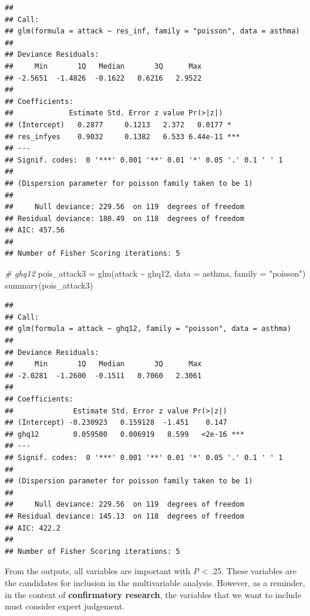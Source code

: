 \documentclass[
  10pt,
]{krantz}
\newenvironment{Shaded}{\begin{snugshade}}{\end{snugshade}}
\newcommand{\AttributeTok}[1]{\textcolor[rgb]{0.77,0.63,0.00}{#1}}
\newcommand{\CommentTok}[1]{\textcolor[rgb]{0.56,0.35,0.01}{\textit{#1}}}
\newcommand{\FunctionTok}[1]{\textcolor[rgb]{0.00,0.00,0.00}{#1}}
\newcommand{\NormalTok}[1]{#1}
\newcommand{\OtherTok}[1]{\textcolor[rgb]{0.56,0.35,0.01}{#1}}
\newcommand{\SpecialCharTok}[1]{\textcolor[rgb]{0.00,0.00,0.00}{#1}}
\newcommand{\StringTok}[1]{\textcolor[rgb]{0.31,0.60,0.02}{#1}}
\begin{document}
\begin{verbatim}
## 
## Call:
## glm(formula = attack ~ res_inf, family = "poisson", data = asthma)
## 
## Deviance Residuals: 
##     Min       1Q   Median       3Q      Max  
## -2.5651  -1.4826  -0.1622   0.6216   2.9522  
## 
## Coefficients:
##             Estimate Std. Error z value Pr(>|z|)    
## (Intercept)   0.2877     0.1213   2.372   0.0177 *  
## res_infyes    0.9032     0.1382   6.533 6.44e-11 ***
## ---
## Signif. codes:  0 '***' 0.001 '**' 0.01 '*' 0.05 '.' 0.1 ' ' 1
## 
## (Dispersion parameter for poisson family taken to be 1)
## 
##     Null deviance: 229.56  on 119  degrees of freedom
## Residual deviance: 180.49  on 118  degrees of freedom
## AIC: 457.56
## 
## Number of Fisher Scoring iterations: 5
\end{verbatim}

\begin{Shaded}
\begin{Highlighting}[]
\CommentTok{\# ghq12}
\NormalTok{pois\_attack3 }\OtherTok{=} \FunctionTok{glm}\NormalTok{(attack }\SpecialCharTok{\textasciitilde{}}\NormalTok{ ghq12, }\AttributeTok{data =}\NormalTok{ asthma, }\AttributeTok{family =} \StringTok{"poisson"}\NormalTok{)}
\FunctionTok{summary}\NormalTok{(pois\_attack3)}
\end{Highlighting}
\end{Shaded}

\begin{verbatim}
## 
## Call:
## glm(formula = attack ~ ghq12, family = "poisson", data = asthma)
## 
## Deviance Residuals: 
##     Min       1Q   Median       3Q      Max  
## -2.0281  -1.2600  -0.1511   0.7060   2.3061  
## 
## Coefficients:
##              Estimate Std. Error z value Pr(>|z|)    
## (Intercept) -0.230923   0.159128  -1.451    0.147    
## ghq12        0.059500   0.006919   8.599   <2e-16 ***
## ---
## Signif. codes:  0 '***' 0.001 '**' 0.01 '*' 0.05 '.' 0.1 ' ' 1
## 
## (Dispersion parameter for poisson family taken to be 1)
## 
##     Null deviance: 229.56  on 119  degrees of freedom
## Residual deviance: 145.13  on 118  degrees of freedom
## AIC: 422.2
## 
## Number of Fisher Scoring iterations: 5
\end{verbatim}

From the outputs, all variables are important with \emph{P} \textless{} .25. These variables are the candidates for inclusion in the multivariable analysis. However, as a reminder, in the context of \textbf{confirmatory research}, the variables that we want to include must consider expert judgement.
\end{document}
